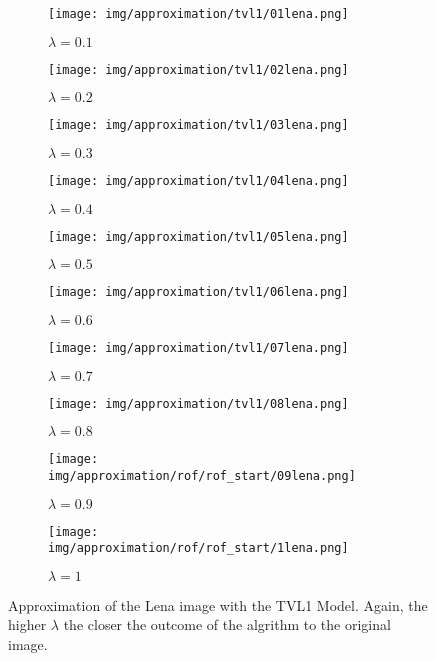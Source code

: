             \begin{figure}[ht]
            \centering
            \begin{subfigure}[b]{0.18\textwidth}
                \texttt{[image: img/approximation/tvl1/01lena.png]}
                \caption{$\lambda = 0.1$}
            \end{subfigure}
            \begin{subfigure}[b]{0.18\textwidth}
                \texttt{[image: img/approximation/tvl1/02lena.png]}
                \caption{$\lambda = 0.2$}
            \end{subfigure}
            \begin{subfigure}[b]{0.18\textwidth}
                \texttt{[image: img/approximation/tvl1/03lena.png]}
                \caption{$\lambda = 0.3$}
            \end{subfigure}
            \begin{subfigure}[b]{0.18\textwidth}
                \texttt{[image: img/approximation/tvl1/04lena.png]}
                \caption{$\lambda = 0.4$}
            \end{subfigure}
            \begin{subfigure}[b]{0.18\textwidth}
                \texttt{[image: img/approximation/tvl1/05lena.png]}
                \caption{$\lambda = 0.5$}
            \end{subfigure}
            \begin{subfigure}[b]{0.18\textwidth}
                \texttt{[image: img/approximation/tvl1/06lena.png]}
                \caption{$\lambda = 0.6$}
            \end{subfigure}
            \begin{subfigure}[b]{0.18\textwidth}
                \texttt{[image: img/approximation/tvl1/07lena.png]}
                \caption{$\lambda = 0.7$}
            \end{subfigure}
            \begin{subfigure}[b]{0.18\textwidth}
                \texttt{[image: img/approximation/tvl1/08lena.png]}
                \caption{$\lambda = 0.8$}
            \end{subfigure}
            \begin{subfigure}[b]{0.18\textwidth}
                \texttt{[image: img/approximation/rof/rof\_start/09lena.png]}
                \caption{$\lambda = 0.9$}
            \end{subfigure}
            \begin{subfigure}[b]{0.18\textwidth}
                \texttt{[image: img/approximation/rof/rof\_start/1lena.png]}
                \caption{$\lambda = 1$}
            \end{subfigure}
            \caption{Approximation of the Lena image with the TVL1 Model. Again, the higher $\lambda$ the closer the outcome of the algrithm to the original image.}
        \label{fig:tvl1_lena_first_compare}
        \end{figure}


